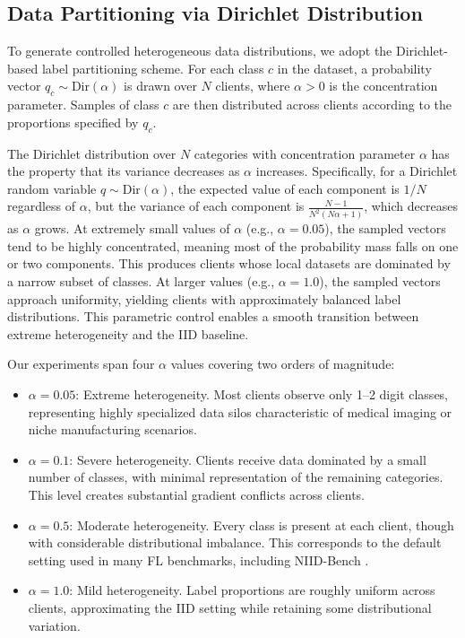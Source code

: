 \documentclass[conference]{IEEEtran}
\begin{document}
\subsection{Data Partitioning via Dirichlet Distribution}

To generate controlled heterogeneous data distributions, we adopt the Dirichlet-based label partitioning scheme. For each class $c$ in the dataset, a probability vector $q_c \sim \text{Dir}(\alpha)$ is drawn over $N$ clients, where $\alpha > 0$ is the concentration parameter. Samples of class $c$ are then distributed across clients according to the proportions specified by $q_c$.

The Dirichlet distribution over $N$ categories with concentration parameter $\alpha$ has the property that its variance decreases as $\alpha$ increases. Specifically, for a Dirichlet random variable $q \sim \text{Dir}(\alpha)$, the expected value of each component is $1/N$ regardless of $\alpha$, but the variance of each component is $\frac{N-1}{N^2(N\alpha + 1)}$, which decreases as $\alpha$ grows. At extremely small values of $\alpha$ (e.g., $\alpha = 0.05$), the sampled vectors tend to be highly concentrated, meaning most of the probability mass falls on one or two components. This produces clients whose local datasets are dominated by a narrow subset of classes. At larger values (e.g., $\alpha = 1.0$), the sampled vectors approach uniformity, yielding clients with approximately balanced label distributions. This parametric control enables a smooth transition between extreme heterogeneity and the IID baseline.

Our experiments span four $\alpha$ values covering two orders of magnitude:

\begin{itemize}
    \item $\alpha = 0.05$: Extreme heterogeneity. Most clients observe only 1--2 digit classes, representing highly specialized data silos characteristic of medical imaging or niche manufacturing scenarios.
    \item $\alpha = 0.1$: Severe heterogeneity. Clients receive data dominated by a small number of classes, with minimal representation of the remaining categories. This level creates substantial gradient conflicts across clients.
    \item $\alpha = 0.5$: Moderate heterogeneity. Every class is present at each client, though with considerable distributional imbalance. This corresponds to the default setting used in many FL benchmarks, including NIID-Bench \cite{li2022niid}.
    \item $\alpha = 1.0$: Mild heterogeneity. Label proportions are roughly uniform across clients, approximating the IID setting while retaining some distributional variation.
\end{itemize}
\end{document}
